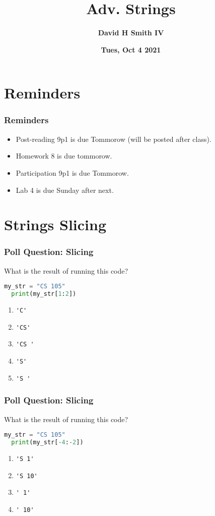 \documentclass{beamer}
\title{\textbf{Adv. Strings}}
\author{\textbf{David H Smith IV}}
\institute[\textbf{UIUC}]{\textbf{University of Illinois Urbana-Champaign}}
\date{\textbf{Tues, Oct 4 2021}}
\begin{document}
\frame{\titlepage}

\section{Reminders}

%
%
\begin{frame}
  \frametitle{Reminders}
  \begin{itemize}
    \item Post-reading 9p1 is due Tommorow (will be posted after class).
    \item Homework 8 is due tommorow.
    \item Participation 9p1 is due Tommorow.
    \item Lab 4 is due Sunday after next.
  \end{itemize}
\end{frame}

\section{Strings Slicing}


%
%
\begin{frame}[fragile]
  \frametitle{Poll Question: Slicing}
  What is the result of running this code?
  \begin{lstlisting}[language=Python, autogobble]
  my_str = "CS 105"
  print(my_str[1:2])
  \end{lstlisting}
  \vfill
  \begin{enumerate}[A]
    \item \lstinline|'C'|
    \item \lstinline|'CS'|
    \item \lstinline|'CS '|
    \item \lstinline|'S'|
    \item \lstinline|'S '|
  \end{enumerate}
\end{frame}



%
%
\begin{frame}[fragile]
  \frametitle{Poll Question: Slicing}
  What is the result of running this code?
  \begin{lstlisting}[language=Python, autogobble]
  my_str = "CS 105"
  print(my_str[-4:-2])
  \end{lstlisting}
  \vfill
  \begin{enumerate}[A]
    \item \lstinline|'S 1'|
    \item \lstinline|'S 10'|
    \item \lstinline|' 1'|
    \item \lstinline|' 10'|
  \end{enumerate}
\end{frame}
\end{document}
